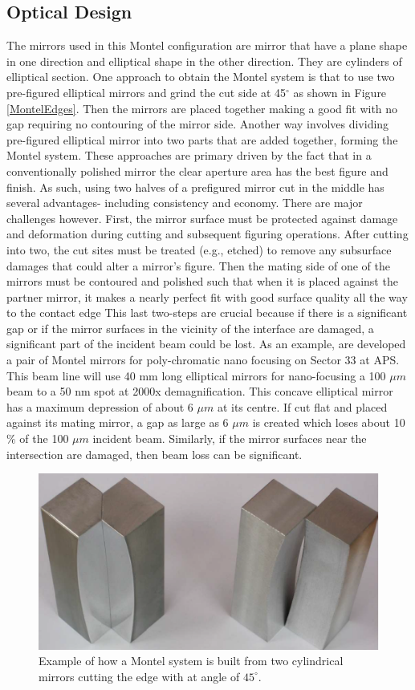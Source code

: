 \subsection{Optical Design \cite{ice2009nested}}
The mirrors used in this Montel configuration are mirror that have a plane shape in one direction and elliptical shape in the other direction. They are cylinders of elliptical section. One approach to obtain the Montel system is that to use two pre-figured elliptical mirrors and grind the cut side at 45$^\circ $ as shown in Figure \ref{MontelEdges}. Then the mirrors are placed together making a good fit with no gap requiring no contouring of the mirror side. Another way involves dividing pre-figured elliptical mirror into two parts that are added  together, forming the Montel system. These approaches are primary driven by the fact that in a conventionally polished mirror the clear aperture area has the best figure and finish. As such, using two halves of a prefigured mirror cut in the middle has several advantages- including consistency and economy. There are major challenges however. First, the mirror surface must be protected against damage and deformation during cutting and subsequent figuring operations. After cutting into two, the cut sites must be treated (e.g., etched) to remove any subsurface damages that could alter a mirror's figure. Then the mating side of one of the mirrors must be contoured and polished such that when it is placed against the partner mirror, it makes a nearly perfect fit with good surface quality all the way to the contact edge This last two-steps are crucial because if there is a significant gap or if the mirror surfaces in the vicinity of the interface are damaged, a significant part of the incident beam could be lost. As an example, are developed a pair of Montel mirrors for poly-chromatic nano focusing on Sector 33 at APS. This beam line will use 40 mm long elliptical mirrors for nano-focusing a 100 $\mu m$ beam to a 50 nm spot at 2000x demagnification. This concave elliptical mirror has a maximum depression of about 6 $\mu m$ at its centre. If cut flat and placed against its mating mirror, a gap as large as 6 $\mu m$ is created which loses about 10$\% $ of the 100 $\mu m$ incident beam. Similarly, if the mirror surfaces near the intersection are damaged, then beam loss can be significant.
\begin{figure}[]
%
\centering
%
\includegraphics[width=.8\textwidth]{Immagini/Chapter2/MontelEdges}
%
\caption{Example of how a Montel system is built from two cylindrical mirrors cutting the edge with at angle of $45^{\circ} $.}
%
\label{fig: MontelEdges}
%
\end{figure}
